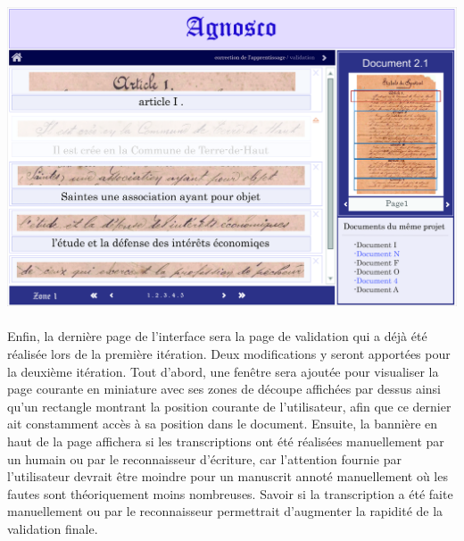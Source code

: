 \begin{mdframed}[frametitle={Figure 5 : Maquette de la page de visualisation des transcriptions du reconnaisseur}, innerbottommargin=10]
\begin{center}
\includegraphics[scale=0.04]{assets/maquetteIHMcorrectionIA.jpg}
\end{center}
\end{mdframed}

\paragraph{}
Enfin, la dernière page de l’interface sera la page de validation qui a déjà été réalisée lors de la première itération. Deux modifications y seront apportées pour la deuxième itération.
\newline{}
Tout d'abord, une fenêtre sera ajoutée pour visualiser la page courante en miniature avec ses zones de découpe affichées par dessus ainsi qu’un rectangle montrant la position courante de l’utilisateur, afin que ce dernier ait constamment accès à sa position dans le document.
\newline{}
Ensuite, la bannière en haut de la page affichera si les transcriptions ont été réalisées manuellement par un humain ou par le reconnaisseur d'écriture, car l'attention fournie par l'utilisateur devrait être moindre pour un manuscrit annoté manuellement où les fautes sont théoriquement moins nombreuses. Savoir si la transcription a été faite manuellement ou par le reconnaisseur permettrait d'augmenter la rapidité de la validation finale.

